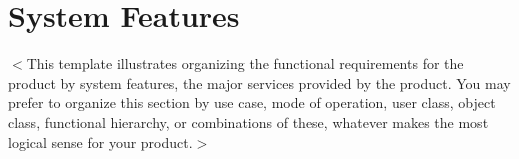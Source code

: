\documentclass{report}
\begin{document}



%
\chapter{System Features}
$<$This template illustrates organizing the functional requirements for the 
product by system features, the major services provided by the product. You may 
prefer to organize this section by use case, mode of operation, user class, 
object class, functional hierarchy, or combinations of these, whatever makes the 
most logical sense for your product.$>$
\end{document}
